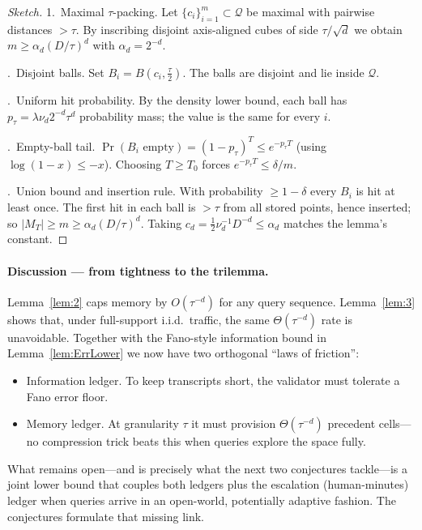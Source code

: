 \documentclass[11pt]{article}
\begin{document}
\begin{proof}[Sketch]
1.~Maximal $\tau$-packing.
Let $\{c_i\}_{i=1}^{m}\subset\mathcal Q$ be maximal with pairwise distances
$>\tau$.  By inscribing disjoint axis-aligned cubes of side $\tau/\sqrt d$ we
obtain $m\ge\alpha_d(D/\tau)^d$ with $\alpha_d=2^{-d}$.

.~Disjoint balls.
Set $B_i=B(c_i,\tfrac{\tau}{2})$.  The balls are disjoint and lie inside
$\mathcal Q$.

.~Uniform hit probability.
By the density lower bound, each ball has
$p_\tau=\lambda\nu_d2^{-d}\tau^{d}$
probability mass; the value is the same for every $i$.

.~Empty-ball tail.
$\Pr(B_i\text{ empty})=(1-p_\tau)^T\le e^{-p_\tau T}$
(using $\log(1-x)\le -x$).  Choosing $T\ge T_0$
forces $e^{-p_\tau T}\le\delta/m$.

.~Union bound and insertion rule.
With probability $\ge1-\delta$ every $B_i$ is hit at least once.
The first hit in each ball is $>\tau$ from all stored points,
hence inserted; so $|M_T|\ge m\ge\alpha_d(D/\tau)^d$.
Taking $c_d=\tfrac12\nu_d^{-1}D^{-d}\le\alpha_d$ matches the lemma's constant.
\end{proof}


\paragraph{Discussion — from tightness to the trilemma.}
Lemma~\ref{lem:2} caps memory by $O(\tau^{-d})$ for any query
sequence.  Lemma~\ref{lem:3} shows that, under full-support
i.i.d.\ traffic, the same $\Theta(\tau^{-d})$ rate is unavoidable.
Together with the Fano-style information bound in
Lemma~\ref{lem:ErrLower} we now have two orthogonal “laws of friction”:

\begin{itemize}\setlength\itemsep{2pt}
\item[\textbullet] Information ledger.
  To keep transcripts short, the validator must tolerate a
  Fano error floor.  
\item[\textbullet] Memory ledger.
  At granularity $\tau$ it must provision
  $\Theta(\tau^{-d})$ precedent cells—no compression trick beats this
  when queries explore the space fully.
\end{itemize}

\noindent
What remains open—and is precisely what the next two conjectures tackle—is a
joint lower bound that couples both ledgers plus the escalation
(human-minutes) ledger when queries arrive in an open-world, potentially
adaptive fashion.  The conjectures formulate that missing link.
\end{document}
